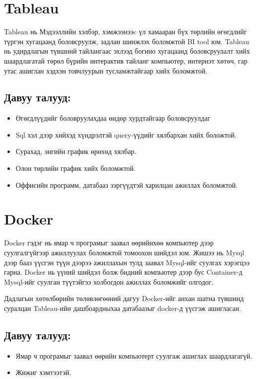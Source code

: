 \section{Tableau}
Tableau нь Мэдээллийн хэлбэр, хэмжээнээc үл хамааран бүх төрлийн өгөгдлийг түргэн хугацаанд боловсруулж, задлан шинжлэх боломжтой BI tool юм. Tableau нь удирдлагын түвшний тайлангаас эхлээд богино хугацаанд боловсруулалт хийх шаардлагатай төрөл бүрийн интерактив тайланг компьютер, интернэт хөтөч, гар утас ашиглан хэдхэн товчлуурын тусламжтайгаар хийх боломжтой.
\subsection{Давуу талууд:}
\begin{itemize}
	\item Өгөгдлүүдийг боловруулахдаа өндөр хурдтайгаар боловсруулдаг
	\item Sql хэл дээр хийхэд хүндрэлтэй query-үүдийг хялбархан хийх боложтой.
	\item Сурахад, энгийн график өрөхөд хялбар.
	\item Олон төрлийн график хийх боломжтой.
	\item Оффисийн программ, датабааз зэргүүдтэй харилцан ажиллах боломжтой.
\end{itemize}


\section{Docker}
Docker гэдэг нь ямар ч програмыг заавал өөрийнхөө компьютер дээр суулгалгүйгээр ажиллуулах боломжтой томоохон шийдэл юм. Жишээ нь Mysql дээр бааз үүсгэн түүн дээрээ ажиллахын тулд заавал Mysql-ийг суулгах хэрэгцээ гарна. Docker нь үүний шийдэл болж бидний компьютер дээр бус Container-д Mysql-ийг суулган түүтэйгээ холбогдон ажиллах боломжийг олгодог. 

Дадлагын хөтөлбөрийн төлөвлөгөөний дагуу Docker-ийг анхан шатна түвшинд суралцан Tableau-ийн дашбоардныхаа датабаазыг docker-д үүсгэж ашигласан.
\subsection{Давуу талууд:}
\begin{itemize}
	\item Ямар ч програмыг заавал өөрийн компьютерт суулгаж ашиглах шаардлагагүй. 
	\item Жижиг хэмтээтэй.
\end{itemize}